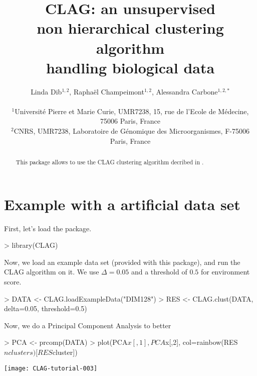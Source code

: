 \documentclass[a4paper]{article}
\title{CLAG: an unsupervised\\
non hierarchical clustering algorithm\\
handling biological data}
\author{Linda Dib$^{1,2}$, Rapha\"el Champeimont$^{1,2}$, Alessandra Carbone$^{1,2,*}$ \\
\\
{\small $^{1}$Universit\'e Pierre et Marie Curie, UMR7238, 15, rue de l'Ecole de M\'edecine, 75006 Paris, France}\\
{\small $^{2}$CNRS, UMR7238, Laboratoire de G\'enomique des Microorganismes, F-75006
Paris, France}
}
\begin{document}


\maketitle

\begin{abstract}
This package allows to use the CLAG clustering algorithm decribed in \cite{CLAG}.
\end{abstract}

\setlength{\parskip}{0mm}
\tableofcontents

\setlength{\parskip}{4mm}

\newpage

\section{Example with a artificial data set}

First, let's load the package.

\begin{Schunk}
\begin{Sinput}
> library(CLAG)
\end{Sinput}
\end{Schunk}

Now, we load an example data set (provided with this package),
and run the CLAG algorithm on it. We use $\Delta=0.05$
and a threshold of $0.5$ for environment score.

\begin{Schunk}
\begin{Sinput}
> DATA <- CLAG.loadExampleData("DIM128")
> RES <- CLAG.clust(DATA, delta=0.05, threshold=0.5)
\end{Sinput}
\end{Schunk}

Now, we do a Principal Component Analysis to better 

\begin{Schunk}
\begin{Sinput}
> PCA <- prcomp(DATA)
> plot(PCA$x[,1], PCA$x[,2], col=rainbow(RES$nclusters)[RES$cluster])
\end{Sinput}
\end{Schunk}
\texttt{[image: CLAG-tutorial-003]}





\end{document}
